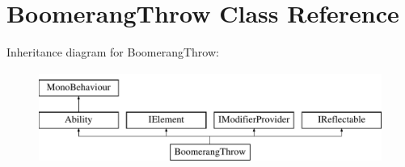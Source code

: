 \hypertarget{class_boomerang_throw}{}\section{Boomerang\+Throw Class Reference}
\label{class_boomerang_throw}
Inheritance diagram for Boomerang\+Throw\+:\begin{figure}[H]
\begin{center}
\leavevmode
\includegraphics[height=3.000000cm]{class_boomerang_throw}
\end{center}
\end{figure}
